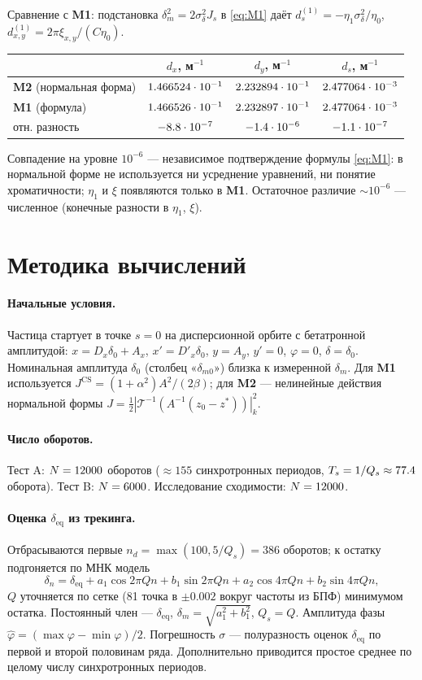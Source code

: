 \documentclass[a4paper,11pt]{article}
\newcommand{\deq}{\delta_{\mathrm{eq}}}
\newcommand{\Mone}{\textbf{M1}}\newcommand{\Mtwo}{\textbf{M2}}
\begin{document}
Сравнение с \Mone: подстановка $\delta_m^2=2\sigma_\delta^2J_s$ в \eqref{eq:M1} даёт $d_s^{(1)}=-\eta_1\sigma_\delta^2/\eta_0$, $d_{x,y}^{(1)}=2\pi\xi_{x,y}/(C\eta_0)$.
\begin{center}
\begin{tabular}{lccc}
\toprule
 & $d_x$, м$^{-1}$ & $d_y$, м$^{-1}$ & $d_s$, м$^{-1}$\\
\midrule
\Mtwo{} (нормальная форма) & $1.466524\cdot10^{-1}$ & $2.232894\cdot10^{-1}$ & $2.477064\cdot10^{-3}$\\
\Mone{} (формула) & $1.466526\cdot10^{-1}$ & $2.232897\cdot10^{-1}$ & $2.477064\cdot10^{-3}$\\
отн. разность & $-8.8\cdot10^{-7}$ & $-1.4\cdot10^{-6}$ & $-1.1\cdot10^{-7}$\\
\bottomrule
\end{tabular}
\end{center}
Совпадение на уровне $10^{-6}$ --- независимое подтверждение формулы \eqref{eq:M1}: в нормальной форме не используется ни усреднение уравнений, ни понятие хроматичности; $\eta_1$ и $\xi$ появляются только в \Mone. Остаточное различие $\sim10^{-6}$ --- численное (конечные разности в $\eta_1$, $\xi$).

\section{Методика вычислений}\label{sec:method}
\paragraph{Начальные условия.} Частица стартует в точке $s=0$ на дисперсионной орбите с бетатронной амплитудой: $x=D_x\delta_0+A_x$, $x'=D'_x\delta_0$, $y=A_y$, $y'=0$, $\varphi=0$, $\delta=\delta_0$. Номинальная амплитуда $\delta_0$ (столбец «$\delta_{m0}$») близка к измеренной $\delta_m$. Для \Mone{} используется $J^{\mathrm{CS}}=(1+\alpha^2)A^2/(2\beta)$; для \Mtwo{} --- нелинейные действия нормальной формы $J=\frac12|\mathcal T^{-1}(A^{-1}(z_0-z^\ast))|^2_k$.

\paragraph{Число оборотов.} Тест A: $N=12000$ оборотов ($\approx155$ синхротронных периодов, $T_s=1/Q_s\approx77.4$ оборота). Тест B: $N=6000$. Исследование сходимости: $N=12000$.

\paragraph{Оценка $\deq$ из трекинга.} Отбрасываются первые $n_d=\max(100,5/Q_s)=386$ оборотов; к остатку подгоняется по МНК модель
\[
\delta_n=\deq+a_1\cos2\pi Qn+b_1\sin2\pi Qn+a_2\cos4\pi Qn+b_2\sin4\pi Qn,
\]
$Q$ уточняется по сетке (81 точка в $\pm0.002$ вокруг частоты из БПФ) минимумом остатка. Постоянный член --- $\deq$, $\delta_m=\sqrt{a_1^2+b_1^2}$, $Q_s=Q$. Амплитуда фазы $\hat\varphi=(\max\varphi-\min\varphi)/2$. Погрешность $\sigma$ --- полуразность оценок $\deq$ по первой и второй половинам ряда. Дополнительно приводится простое среднее по целому числу синхротронных периодов.
\end{document}
